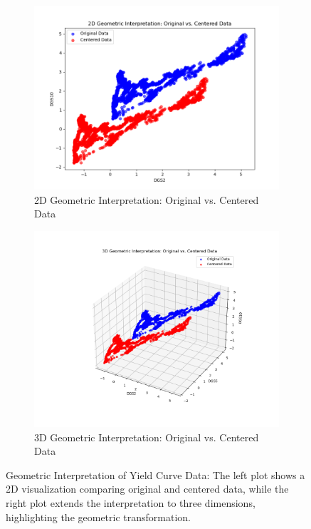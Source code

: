 \documentclass[12pt]{article}
\begin{document}
\begin{figure}[H]
    \centering
    \begin{subfigure}[b]{0.48\textwidth}
        \centering
        \includegraphics[width=\linewidth]{visuals/2d_geometric_interpretation.png}
        \caption{2D Geometric Interpretation: Original vs. Centered Data}
    \end{subfigure}
    \hfill
    \begin{subfigure}[b]{0.48\textwidth}
        \centering
        \includegraphics[width=\linewidth]{visuals/3d_geometric_interpretation.png}
        \caption{3D Geometric Interpretation: Original vs. Centered Data}
    \end{subfigure}
    \caption{Geometric Interpretation of Yield Curve Data: The left plot shows a 2D visualization comparing original and centered data, while the right plot extends the interpretation to three dimensions, highlighting the geometric transformation.}
    \label{fig:geo_int}
\end{figure}
\end{document}
